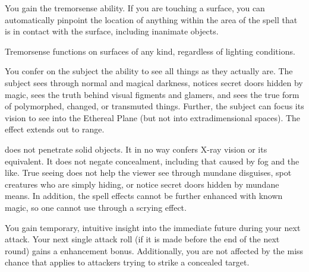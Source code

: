 \begin{spelleffect}
  You gain the tremorsense ability. If you are touching a surface, you can automatically pinpoint the location of anything within the area of the spell that is in contact with the surface, including inanimate objects.
\end{spelleffect}
\begin{spellnotes}
  Tremorsense functions on surfaces of any kind, regardless of lighting conditions.
\end{spellnotes}

\spelldur{\durshort}
\begin{spelleffect}
  You confer on the subject the ability to see all things as they actually are. The subject sees through normal and magical darkness, notices secret doors hidden by magic, sees the truth behind visual figments and glamers, and sees the true form of polymorphed, changed, or transmuted things. Further, the subject can focus its vision to see into the Ethereal Plane (but not into extradimensional spaces). The effect extends out to \rngmed range.
\end{spelleffect}
\begin{spellnotes}
   does not penetrate solid objects. It in no way confers X-ray vision or its equivalent. It does not negate concealment, including that caused by fog and the like. True seeing does not help the viewer see through mundane disguises, spot creatures who are simply hiding, or notice secret doors hidden by mundane means. In addition, the spell effects cannot be further enhanced with known magic, so one cannot use  through a scrying effect.
\end{spellnotes}

\begin{spelleffect}
  You gain temporary, intuitive insight into the immediate future during your next attack. Your next single attack roll (if it is made before the end of the next round) gains a  enhancement bonus. Additionally, you are not affected by the miss chance that applies to attackers trying to strike a concealed target.
\end{spelleffect}

